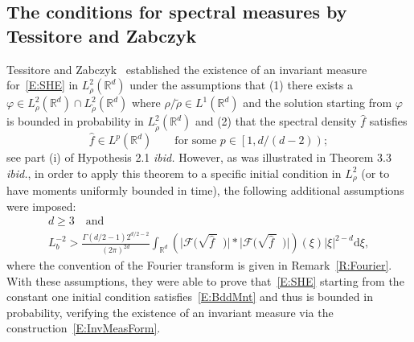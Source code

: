 \documentclass[sn-mathphys]{sn-jnl}%
\newcommand{\BR}{\mathbb{R}}
\newcommand{\ud}{\ensuremath{\mathrm{d}}}
\numberwithin{equation}{section}
\theoremstyle{thmstyleone}%
\theoremstyle{thmstyletwo}%
\theoremstyle{thmstylethree}%
\begin{document}
\subsection{The conditions for spectral measures by Tessitore and Zabczyk}\label{SS:TessZabz}

Tessitore and Zabczyk~\cite{tessitore.zabczyk:98:invariant} established the existence of an
invariant measure for~\eqref{E:SHE} in $L^2_{\rho}(\BR^d)$ under the assumptions that (1) there
exists a $\varphi \in L^2_{\rho}(\BR^d) \cap L^2_{\widetilde\rho}(\BR^d)$ where $\rho/\widetilde\rho
\in L^1 (\BR^d)$ and the solution starting from $\varphi$ is bounded in probability in
$L^2_{\widetilde \rho}(\BR^d)$ and (2) that the spectral density $\hat{f}$ satisfies
\begin{equation}\label{E:CorTZ}
\widehat{f} \in L^p (\BR^d) \qquad \text{for some $p \in \left[1, d/(d-2)\right)$};
\end{equation}
see part (i) of Hypothesis 2.1 \textit{ibid.} However, as was illustrated in Theorem 3.3
\textit{ibid.}, in order to apply this theorem to a specific initial condition in $L^2_{\rho}$ (or
to have moments uniformly bounded in time), the following additional assumptions were imposed:
\begin{equation}\label{E:TZspec}
  \begin{gathered}
  d\ge 3 \quad \text{and} \quad \\
  L_b^{-2}> \frac{\Gamma(d/2 -1)2^{d/2-2}}{(2\pi)^{2d}} \int_{\BR^d} \left(\lvert \mathcal{F}\big(\sqrt{\widehat{f}\:}\:\:\big) \rvert * \lvert \mathcal{F}\big(\sqrt{\widehat{f}\:}\:\:\big)\rvert\right) (\xi) \lvert \xi \rvert^{2-d} \ud \xi ,
  \end{gathered}
\end{equation}
where the convention of the Fourier transform is given in Remark~\ref{R:Fourier}. With these
assumptions, they were able to prove that~\eqref{E:SHE} starting from the constant one initial
condition satisfies~\eqref{E:BddMnt} and thus is bounded in probability, verifying the existence of
an invariant measure via the construction~\eqref{E:InvMeasForm}.

\end{document}
